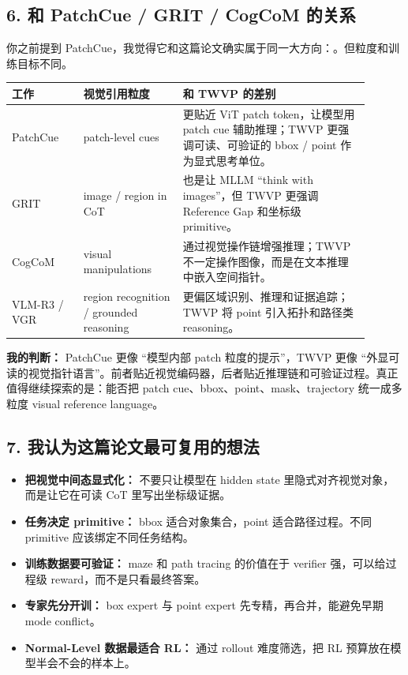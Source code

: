 \subsection{6. 和 PatchCue / GRIT / CogCoM 的关系}

你之前提到 PatchCue，我觉得它和这篇论文确实属于同一大方向：。但粒度和训练目标不同。

\begin{center}
\small
\setlength{\tabcolsep}{4pt}
\begin{tabular}{p{0.18\linewidth}p{0.25\linewidth}p{0.47\linewidth}}
\toprule
\textbf{工作} & \textbf{视觉引用粒度} & \textbf{和 TWVP 的差别} \\
\midrule
PatchCue & patch-level cues & 更贴近 ViT patch token，让模型用 patch cue 辅助推理；TWVP 更强调可读、可验证的 bbox / point 作为显式思考单位。 \\
GRIT & image / region in CoT & 也是让 MLLM ``think with images''，但 TWVP 更强调 Reference Gap 和坐标级 primitive。 \\
CogCoM & visual manipulations & 通过视觉操作链增强推理；TWVP 不一定操作图像，而是在文本推理中嵌入空间指针。 \\
VLM-R3 / VGR & region recognition / grounded reasoning & 更偏区域识别、推理和证据追踪；TWVP 将 point 引入拓扑和路径类 reasoning。 \\
\bottomrule
\end{tabular}
\end{center}

\begin{intubox}
\textbf{我的判断：} PatchCue 更像 ``模型内部 patch 粒度的提示''，TWVP 更像 ``外显可读的视觉指针语言''。前者贴近视觉编码器，后者贴近推理链和可验证过程。真正值得继续探索的是：能否把 patch cue、bbox、point、mask、trajectory 统一成多粒度 visual reference language。
\end{intubox}

\subsection{7. 我认为这篇论文最可复用的想法}

\begin{itemize}[leftmargin=1.5em]
  \item \textbf{把视觉中间态显式化：} 不要只让模型在 hidden state 里隐式对齐视觉对象，而是让它在可读 CoT 里写出坐标级证据。
  \item \textbf{任务决定 primitive：} bbox 适合对象集合，point 适合路径过程。不同 primitive 应该绑定不同任务结构。
  \item \textbf{训练数据要可验证：} maze 和 path tracing 的价值在于 verifier 强，可以给过程级 reward，而不是只看最终答案。
  \item \textbf{专家先分开训：} box expert 与 point expert 先专精，再合并，能避免早期 mode conflict。
  \item \textbf{Normal-Level 数据最适合 RL：} 通过 rollout 难度筛选，把 RL 预算放在模型半会不会的样本上。
\end{itemize}

